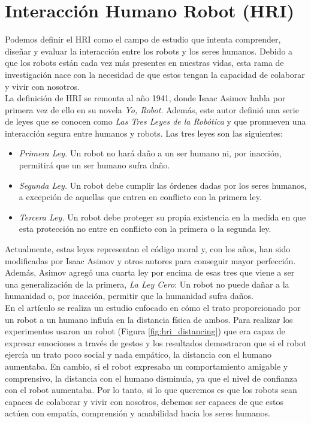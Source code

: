 \section{Interacción Humano Robot (HRI)}
\label{sec:interaccion_humano_robot}

Podemos definir el HRI como el campo de estudio que intenta comprender, diseñar y evaluar la interacción entre los robots y los seres humanos. Debido a que los robots están cada vez más presentes en nuestras vidas, esta rama de investigación nace con la necesidad de que estos tengan la capacidad de colaborar y vivir con nosotros.\\

La definición de HRI se remonta al año 1941, donde Isaac Asimov habla por primera vez de ello en su novela \textit{Yo, Robot}. Además, este autor definió una serie de leyes que se conocen como \textit{Las Tres Leyes de la Robótica} y que promueven una interacción segura entre humanos y robots. Las tres leyes son las siguientes:

\begin{itemize}
    \item \textit{Primera Ley.} Un robot no hará daño a un ser humano ni, por inacción, permitirá que un ser humano sufra daño.
    \item \textit{Segunda Ley.} Un robot debe cumplir las órdenes dadas por los seres humanos, a excepción de aquellas que entren en conflicto con la primera ley.
    \item \textit{Tercera Ley.} Un robot debe proteger su propia existencia en la medida en que esta protección no entre en conflicto con la primera o la segunda ley.
\end{itemize}

Actualmente, estas leyes representan el código moral y, con los años, han sido modificadas por Isaac Asimov y otros autores para conseguir mayor perfección. Además, Asimov agregó una cuarta ley por encima de esas tres que viene a ser una generalización de la primera, \textit{La Ley Cero}: Un robot no puede dañar a la humanidad o, por inacción, permitir que la humanidad sufra daños.\\

En el artículo \cite{hri_distancing} se realiza un estudio enfocado en cómo el trato proporcionado por un robot a un humano influía en la distancia física de ambos. Para realizar los experimentos usaron un robot (Figura \ref{fig:hri_distancing}) que era capaz de expresar emociones a través de gestos y los resultados demostraron que si el robot ejercía un trato poco social y nada empático, la distancia con el humano aumentaba. En cambio, si el robot expresaba un comportamiento amigable y comprensivo, la distancia con el humano disminuía, ya que el nivel de confianza con el robot aumentaba. Por lo tanto, si lo que queremos es que los robots sean capaces de colaborar y vivir con nosotros, debemos ser capaces de que estos actúen con empatía, comprensión y amabilidad hacia los seres humanos.\\

